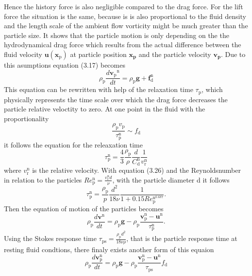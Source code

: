 \documentclass[11pt,a4paper,openany,oneside,parskip=half*]{article}
\renewcommand*\vec[1]{\boldsymbol{#1}}
\begin{document}
Hence the history force is also negligible compared to the drag force.
For the lift force the situation is the same, because is is also proportional to the fluid density and the length scale of the ambient flow vorticity might be much greater than the particle size.
It shows that the particle motion is only depending on the the hydrodynamical drag force which results from the actual difference between the fluid velocity $\vec{u}(\vec{x}_\mathrm{p})$ at particle position $\vec{x_p}$ and the particle velocity $\vec{v_p}$.
Due to this asumptions equation (3.17) becomes
\begin{equation}
\rho_\mathrm{p}\frac{d\vec{v_\mathrm{p}}^\mathrm{n}}{dt} = \rho_\mathrm{p}\vec{g}+\vec{f}_\mathrm{d}^\mathrm{n}
\end{equation}
This equation can be rewritten with help of the relaxation time $\tau_\mathrm{p}$, which physically represents the time scale over which the drag force decreases the particle relative veloctity to zero. At one point in the fluid with the proportionality 
\begin{equation}
\frac{\rho_\mathrm{p} v_\mathrm{p}}{\tau_\mathrm{p}^\mathrm{n}} \sim f_\mathrm{d}
\end{equation} it follows the equation for the releaxation time
\begin{equation}
\tau_\mathrm{p}^\mathrm{n} = \frac{4}{3}\frac{\rho_\mathrm{p}}{\rho} \frac{d}{C_\mathrm{d}^\mathrm{n}}\frac{1}{v_\mathrm{r}^\mathrm{n}}
\end{equation}
where $v_\mathrm{r}^\mathrm{n}$ is the relative velocity. 
With equation (3.26) and the Reynoldsnumber in relation to the particles $Re_\mathrm{p}^\mathrm{n}=\frac{v_\mathrm{r}^\mathrm{n}d}{\nu}$, with the particle diameter d it follows
\begin{equation}
\tau_\mathrm{p}^\mathrm{n} = \frac{\rho_\mathrm{p}}{p}\frac{d^2}{18\nu}\frac{1}{1+0.15Re_\mathrm{p}^\mathrm{n^\mathrm{0.687}}}.
\end{equation} 
Then the equation of motion of the particles becomes
\begin{equation}
\rho_\mathrm{p}\frac{d\vec{v}^\mathrm{n}}{dt} = \rho_\mathrm{p}\vec{g}-\rho_\mathrm{p}\frac{\vec{v}_\mathrm{p}^\mathrm{n}-\vec{u}^\mathrm{n}}{\tau_\mathrm{p}^\mathrm{n}}.
\end{equation}
Using the Stokes response time $\tau_\mathrm{ps} = \frac{\rho_\mathrm{p}d^2}{18\nu\rho}$, that is the particle response time at resting fluid condtions, there finaly exists another form of this equaion 
\begin{equation}
\rho_\mathrm{p}\frac{d\vec{v}_\mathrm{p}^\mathrm{n}}{dt} = \rho_\mathrm{p}\vec{g}-\rho_\mathrm{p}\frac{\vec{v}_\mathrm{p}^\mathrm{n}-\vec{u}^\mathrm{n}}{\tau_\mathrm{ps}}f_\mathrm{d}
\end{equation}
\end{document}
